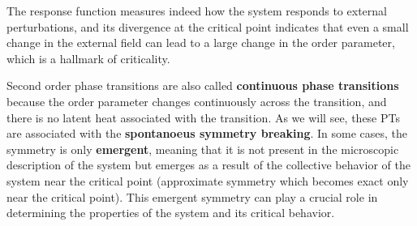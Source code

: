 The response function measures indeed how the system responds to external perturbations, and its divergence at the critical point indicates that even a small change in the external field can lead to a large change in the order parameter, which is a hallmark of criticality.

\begin{remark}
    Second order phase transitions are also called \textbf{continuous phase transitions} because the order parameter changes continuously across the transition, and there is no latent heat associated with the transition. As we will see, these PTs are associated with the \textbf{spontanoeus symmetry breaking}. In some cases, the symmetry is only \textbf{emergent}, meaning that it is not present in the microscopic description of the system but emerges as a result of the collective behavior of the system near the critical point (approximate symmetry which becomes exact only near the critical point). This emergent symmetry can play a crucial role in determining the properties of the system and its critical behavior.
\end{remark}